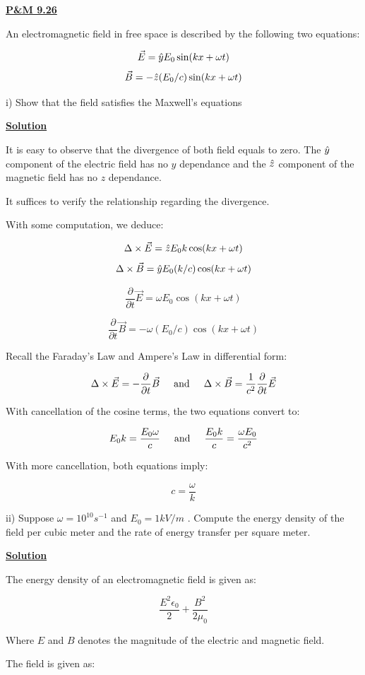 \documentclass{article}
\newcommand{\new}[1]{
    \vspace{2mm}
    \noindent
    \textbf{
    \underline{#1}}
}
\newcommand{\textAnd}{
    {
        \hspace{5mm}
        \textrm{and}
        \hspace{5mm}
    }
}
\newcommand{\parderiv}[1]{{
    \frac{\partial}{\partial{#1}}
}
}
\begin{document}
\new{P\&M 9.26}
An electromagnetic field in free space is described 
by the following two equations:

\[
    \vec{E} = \hat{y} E_0 \sin(kx + \omega t)
\]
\[
    \vec{B} = -\hat{z} (E_0/c) \sin(kx + \omega t)
\]

i) Show that the field satisfies the Maxwell's equations 

\new{Solution}
It is easy to observe that the divergence of both field 
equals to zero. The $\hat{y}$ component of the electric field 
has no $y$ dependance and the $\hat{z}$ component of the 
magnetic field has no $z$ dependance. 

It suffices to verify the relationship regarding the divergence. 

With some computation, we deduce:

\[
    \Delta \times \vec{E} 
    = 
    \hat{z} E_0 k \cos(kx+ \omega t)
\]
\[
    \Delta \times \vec{B}
    =
    \hat{y} E_0(k/c) \cos(kx + \omega t)
\]

\[
    \parderiv{t} \vec{E}
    = 
    \omega E_0 \cos(kx + \omega t)
\]

\[
    \parderiv{t} \vec{B}
    =
    -\omega (E_0/c) \cos(kx + \omega t)
\]

Recall the Faraday's Law and Ampere's Law in differential form:

\[
    \Delta \times \vec{E} 
    = 
    - \parderiv{t} \vec{B}
    \textAnd
    \Delta \times \vec{B}
    =
    \frac{1}{c^2}\parderiv{t} \vec{E}
\]

With cancellation of the cosine terms, the two equations convert to:

\[
    E_0 k = \frac{E_0 \omega}{c}
    \textAnd
    \frac{E_0k}{c} = 
    \frac{\omega E_0}{c^2}
\]

With more cancellation, both equations imply:

\[
    \boxed{
    c = \frac{\omega}{k}
    }
\]


\vspace{5mm}
ii) Suppose $\omega = 10^{10}s^{-1}$ and $E_0 = 1kV/m$
. Compute the energy density of the field per cubic meter 
and the rate of energy transfer per square meter. 

\new{Solution}
The energy density of an electromagnetic field is 
given as:

\[
    \frac{E^2\epsilon_0}{2} + \frac{ B^2}{2\mu_0}
\]

Where $E$ and $B$ denotes the magnitude of the electric 
and magnetic field. 

The field is given as:
\end{document}
